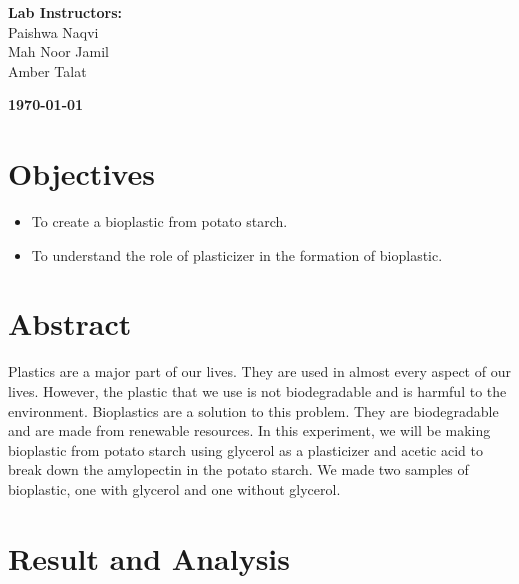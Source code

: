 \documentclass[a4paper, 12pt, english]{article}
\begin{document}
\begin{titlepage}
\begin{center}
		\vspace{45pt}
		\textbf {\large Lab Instructors:}\\[0.2cm]
		\Large {Paishwa Naqvi}\\[0.1cm]
		\Large {Mah Noor Jamil}\\[0.1cm]
		\Large {Amber Talat}\\[0.1cm]
	\end{center}

	\par
	\vfill
	\begin{center}
		\textbf{\today}\\
	\end{center}

\end{titlepage}



\newpage
\section{Objectives}
\begin{itemize}
	\item To create a bioplastic from potato starch.
	\item To understand the role of plasticizer in the formation of bioplastic.
\end{itemize}

\section{Abstract}
Plastics are a major part of our lives. They are used in almost every aspect of
our lives. However, the plastic that we use is not biodegradable and is harmful
to the environment. Bioplastics are a solution to this problem. They are
biodegradable and are made from renewable resources. In this experiment, we
will be making bioplastic from potato starch using glycerol as a plasticizer
and acetic acid to break down the amylopectin in the potato starch. We made two
samples of bioplastic, one with glycerol and one without glycerol.

\section{Result and Analysis}
\end{document}
